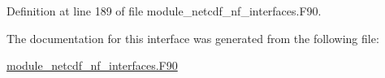 Definition at line 189 of file module\+\_\+netcdf\+\_\+nf\+\_\+interfaces.\+F90.



The documentation for this interface was generated from the following file\+:\begin{DoxyCompactItemize}
\item 
\hyperlink{module__netcdf__nf__interfaces_8F90}{module\+\_\+netcdf\+\_\+nf\+\_\+interfaces.\+F90}\end{DoxyCompactItemize}
